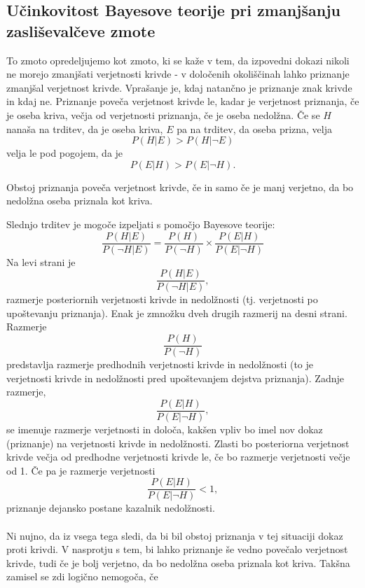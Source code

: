 \documentclass[mat1, tisk]{fmfdelo}
\theoremstyle{definition} %
\theoremstyle{trditev} %
\theoremstyle{izrek}
\begin{document}
\subsection{Učinkovitost Bayesove teorije pri zmanjšanju zasliševalčeve zmote}
To zmoto opredeljujemo kot zmoto, ki se kaže v tem, da izpovedni dokazi nikoli ne morejo zmanjšati verjetnosti krivde - v določenih okoliščinah 
lahko priznanje zmanjšal verjetnost krivde. Vprašanje je, kdaj natančno je priznanje znak krivde in kdaj ne. Priznanje poveča verjetnost krivde 
le, kadar je verjetnost priznanja, če je oseba kriva, večja od verjetnosti priznanja, če je oseba nedolžna. Če se $H$ nanaša na trditev, da je 
oseba kriva, $E$ pa na trditev, da oseba prizna, velja
\[
    P(H \lvert E) > P(H \lvert \neg E)
\]  
velja le pod pogojem, da je 
\[
    P(E \lvert H) > P(E \lvert \neg H).
\] 
\begin{trditev}
    Obstoj priznanja poveča verjetnost krivde, če in samo če je manj verjetno, da bo nedolžna oseba priznala kot kriva.
\end{trditev}
Slednjo trditev je mogoče izpeljati s pomočjo Bayesove teorije:
\begin{equation}\label{eq:btrditev}
    \frac{P(H \lvert E)}{P(\neg H \lvert E)} = \frac{P(H)}{P(\neg H)}  \times \frac{P(E \lvert H)}{P(E \lvert \neg H)}
\end{equation}
Na levi strani je \[\frac{P(H \lvert E)}{P(\neg H \lvert E)},\] razmerje posteriornih verjetnosti krivde in nedolžnosti (tj. verjetnosti po 
upoštevanju priznanja). Enak je zmnožku dveh drugih razmerij na desni strani. Razmerje \[\frac{P(H)}{P(\neg H)}\] predstavlja razmerje predhodnih 
verjetnosti krivde in nedolžnosti (to je verjetnosti krivde in nedolžnosti pred upoštevanjem dejstva priznanja). Zadnje razmerje, 
\[\frac{P(E \lvert H)}{P(E \lvert \neg H)},\] se imenuje razmerje verjetnosti in določa, kakšen vpliv bo imel nov dokaz (priznanje) na 
verjetnosti krivde in nedolžnosti. Zlasti bo posteriorna verjetnost krivde večja od predhodne verjetnosti krivde le, če bo razmerje verjetnosti 
večje od 1. Če pa je razmerje verjetnosti \[\frac{P(E \lvert H)}{P(E \lvert \neg H)} < 1,\] priznanje dejansko postane kazalnik nedolžnosti. \\\\
Ni nujno, da iz vsega tega sledi, da bi bil obstoj priznanja v tej situaciji dokaz proti krivdi. V nasprotju s tem, bi lahko priznanje še vedno 
povečalo verjetnost krivde, tudi če je bolj verjetno, da bo nedolžna oseba priznala kot kriva. Takšna zamisel se zdi logično nemogoča, če 
\end{document}

